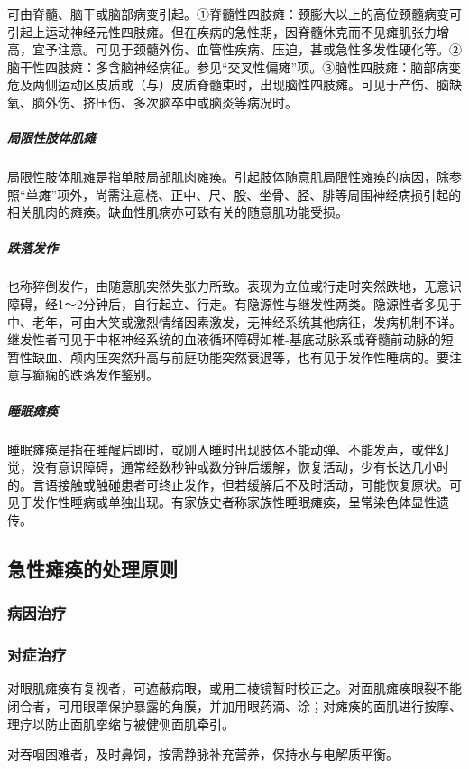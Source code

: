 可由脊髓、脑干或脑部病变引起。①脊髓性四肢瘫：颈膨大以上的高位颈髓病变可引起上运动神经元性四肢瘫。但在疾病的急性期，因脊髓休克而不见瘫肌张力增高，宜予注意。可见于颈髓外伤、血管性疾病、压迫，甚或急性多发性硬化等。②脑干性四肢瘫：多含脑神经病征。参见“交叉性偏瘫”项。③脑性四肢瘫：脑部病变危及两侧运动区皮质或（与）皮质脊髓束时，出现脑性四肢瘫。可见于产伤、脑缺氧、脑外伤、挤压伤、多次脑卒中或脑炎等病况时。

\subparagraph{局限性肢体肌瘫}

局限性肢体肌瘫是指单肢局部肌肉瘫痪。引起肢体随意肌局限性瘫痪的病因，除参照“单瘫”项外，尚需注意桡、正中、尺、股、坐骨、胫、腓等周围神经病损引起的相关肌肉的瘫痪。缺血性肌病亦可致有关的随意肌功能受损。

\subparagraph{跌落发作}

也称猝倒发作，由随意肌突然失张力所致。表现为立位或行走时突然跌地，无意识障碍，经1～2分钟后，自行起立、行走。有隐源性与继发性两类。隐源性者多见于中、老年，可由大笑或激烈情绪因素激发，无神经系统其他病征，发病机制不详。继发性者可见于中枢神经系统的血液循环障碍如椎-基底动脉系或脊髓前动脉的短暂性缺血、颅内压突然升高与前庭功能突然衰退等，也有见于发作性睡病的。要注意与癫痫的跌落发作鉴别。

\subparagraph{睡眠瘫痪}

睡眠瘫痪是指在睡醒后即时，或刚入睡时出现肢体不能动弹、不能发声，或伴幻觉，没有意识障碍，通常经数秒钟或数分钟后缓解，恢复活动，少有长达几小时的。言语接触或触碰患者可终止发作，但若缓解后不及时活动，可能恢复原状。可见于发作性睡病或单独出现。有家族史者称家族性睡眠瘫痪，呈常染色体显性遗传。

\subsection{急性瘫痪的处理原则}

\subsubsection{病因治疗}

\subsubsection{对症治疗}

对眼肌瘫痪有复视者，可遮蔽病眼，或用三棱镜暂时校正之。对面肌瘫痪眼裂不能闭合者，可用眼罩保护暴露的角膜，并加用眼药滴、涂；对瘫痪的面肌进行按摩、理疗以防止面肌挛缩与被健侧面肌牵引。

对吞咽困难者，及时鼻饲，按需静脉补充营养，保持水与电解质平衡。

